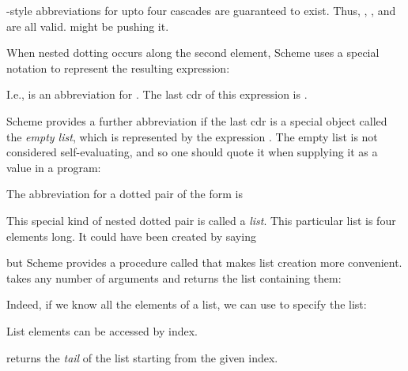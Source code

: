 {\n {}-style abbreviations for upto four cascades are
guaranteed to exist.  Thus, , , and
 are all valid.   might be pushing it.

When nested dotting occurs along the second element,
Scheme uses a special notation to represent the
resulting expression:


\n I.e.,  is an abbreviation for .  The last cdr of this
expression is .


Scheme provides a further abbreviation if the last cdr
is a special object called the {\em empty list}, which
is represented by the expression \q{()}.  The empty
list is not considered self-evaluating, and so one
should quote it when supplying it as a value in a
program:


\n The abbreviation for a dotted pair of the form  is


\n 
{}
This special kind of nested dotted pair is called a
{\em list}.  This particular list is four elements
long.  It could have been created by saying


\n but Scheme provides a procedure called  that
makes list creation more convenient.   takes
any number of arguments and returns the list containing
them:


Indeed, if we know all the elements of a list, we can use
 to specify the list:


\n 
{}
List elements can be accessed by index.


\n {} returns the {\em tail} of the list
starting from the given index.

}
